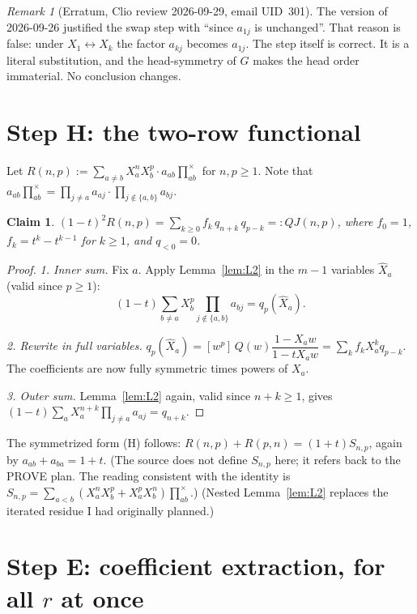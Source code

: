 \documentclass[11pt]{amsart}
\newtheorem{claim}[theorem]{Claim}
\theoremstyle{remark}
\newtheorem*{remark}{Remark}
\newcommand{\hX}{\widehat{X}}
\newcommand{\cross}{\textstyle\prod^{\times}}
\begin{document}
\begin{remark}[Erratum, Clio review 2026-09-29, email UID~301]
The version of 2026-09-26 justified the swap step with ``since $a_{1j}$ is unchanged''. That reason is false: under $X_1\leftrightarrow X_k$ the factor $a_{kj}$ becomes $a_{1j}$. The step itself is correct. It is a literal substitution, and the head-symmetry of $G$ makes the head order immaterial. No conclusion changes.
\end{remark}

\section{Step H: the two-row functional}\label{sec:H}

Let $R(n,p) := \sum_{a\ne b}X_a^nX_b^p\cdot a_{ab}\cross_{ab}$ for $n,p\ge1$. Note that $a_{ab}\cross_{ab} = \prod_{j\ne a}a_{aj}\cdot\prod_{j\notin\{a,b\}}a_{bj}$.

\begin{claim}\label{cl:H}
$(1-t)^2R(n,p) = \sum_{k\ge0}f_k\,q_{n+k}\,q_{p-k} =: QJ(n,p)$, where $f_0 = 1$, $f_k = t^k-t^{k-1}$ for $k\ge1$, and $q_{<0} = 0$.
\end{claim}

\begin{proof}
\emph{1. Inner sum.} Fix $a$. Apply Lemma~\ref{lem:L2} in the $m-1$ variables $\hX_a$ (valid since $p\ge1$):
\[
(1-t)\sum_{b\ne a}X_b^p\prod_{j\notin\{a,b\}}a_{bj} = q_p(\hX_a).
\]

\emph{2. Rewrite in full variables.} $q_p(\hX_a) = [w^p]\,Q(w)\dfrac{1-X_aw}{1-tX_aw} = \sum_kf_kX_a^kq_{p-k}$. The coefficients are now fully symmetric times powers of $X_a$.

\emph{3. Outer sum.} Lemma~\ref{lem:L2} again, valid since $n+k\ge1$, gives $(1-t)\sum_aX_a^{n+k}\prod_{j\ne a}a_{aj} = q_{n+k}$.
\end{proof}

The symmetrized form (H) follows: $R(n,p)+R(p,n) = (1+t)S_{n,p}$, again by $a_{ab}+a_{ba} = 1+t$. (The source does not define $S_{n,p}$ here; it refers back to the PROVE plan. The reading consistent with the identity is $S_{n,p} = \sum_{a<b}(X_a^nX_b^p+X_a^pX_b^n)\cross_{ab}$.) (Nested Lemma~\ref{lem:L2} replaces the iterated residue I had originally planned.)

\section{Step E: coefficient extraction, for all $r$ at once}\label{sec:E}
\end{document}

